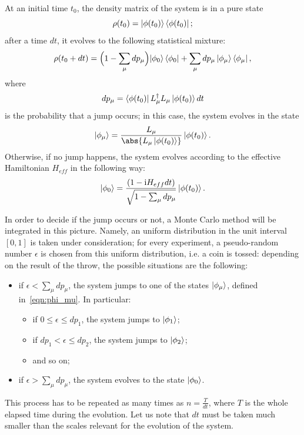 At an initial time $t_0$, the density matrix of the system is in a pure state
\[
\rho(t_0) = \ket{\phi(t_0)}\bra{\phi(t_0)};
\]
after a time $dt$, it evolves to the following statistical mixture:
\begin{equation}
    \rho(t_0 + dt) = \Bigl(1-\sum_\mu dp_\mu \Bigl)\ket{\phi_0}\bra{\phi_0} + \sum_\mu dp_\mu \ket{\phi_\mu}\bra{\phi_\mu},
\end{equation}
where
\begin{equation}
    dp_\mu = \bra{\phi(t_0)}L_{\mu}^{\dagger}L_{\mu}\ket{\phi(t_0)}dt
\end{equation}
is the probability that a jump occurs; in this case, the system evolves in the state
\begin{equation}
\label{eqn:phi_mu}
    \ket{\phi_\mu} = \frac{L_\mu}{\abs{L_\mu\ket{\phi(t_0)}}}\ket{\phi(t_0)}.
\end{equation}
Otherwise, if no jump happens, the system evolves according to the effective Hamiltonian $H_{eff}$ in the following way:
\begin{equation}
    \ket{\phi_0} = \frac{(1-\textrm{i}H_{eff}dt)}{\sqrt{1-\sum_\mu dp_\mu}}\ket{\phi(t_0)}.
\end{equation}

In order to decide if the jump occurs or not, a Monte Carlo method will be integrated in this picture. Namely, an uniform distribution in the unit interval $[0,1]$ is taken under consideration; for every experiment, a pseudo-random number $\epsilon$ is chosen from this uniform distribution, i.e. a coin is tossed: depending on the result of the throw, the possible situations are the following:
\begin{itemize}
    \item if $\epsilon < \sum_\mu dp_\mu$, the system jumps to one of the states $\ket{\phi_\mu}$, defined in~\ref{eqn:phi_mu}. In particular:
    \begin{itemize}
        \item if $0 \leq \epsilon \leq dp_1$, the system jumps to $\ket{\phi_1}$;
        \item if $dp_1 < \epsilon \leq dp_2$, the system jumps to $\ket{\phi_2}$;
        \item and so on;
    \end{itemize}
    \item if $\epsilon > \sum_\mu dp_\mu$, the system evolves to the state $\ket{\phi_0}$.
\end{itemize}

This process has to be repeated as many times as $n = \frac{T}{dt}$, where $T$ is the whole elapsed time during the evolution. Let us note that $dt$ must be taken much smaller than the scales relevant for the evolution of the system.

